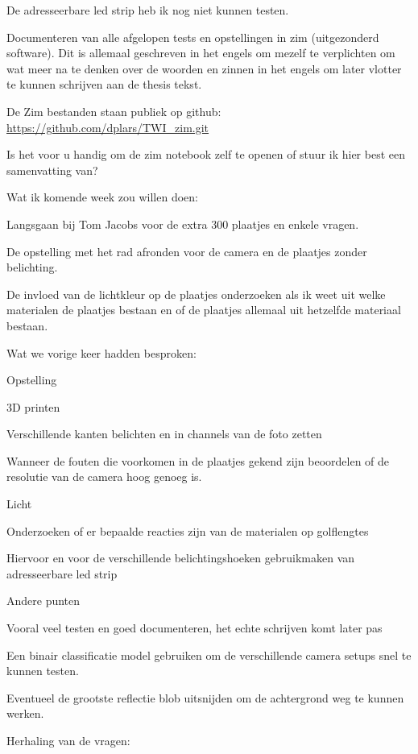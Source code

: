 \documentclass{scrartcl}
\begin{document}
De adresseerbare led strip heb ik nog niet kunnen testen.

Documenteren van alle afgelopen tests en opstellingen in zim (uitgezonderd software). Dit is allemaal geschreven in het engels om mezelf te verplichten om wat meer na te denken over de woorden en zinnen in het engels om later vlotter te kunnen schrijven aan de thesis tekst.

De Zim bestanden staan publiek op github: \href{https://github.com/dplars/TWI_zim.git}{https://github.com/dplars/TWI\_zim.git}

Is het voor u handig om de zim notebook zelf te openen of stuur ik hier best een samenvatting van?

 

Wat ik komende week zou willen doen:

Langsgaan bij Tom Jacobs voor de extra 300 plaatjes en enkele vragen.

De opstelling met het rad afronden voor de camera en de plaatjes zonder belichting.

De invloed van de lichtkleur op de plaatjes onderzoeken als ik weet uit welke materialen de plaatjes bestaan en of de plaatjes allemaal uit hetzelfde materiaal bestaan.

 

Wat we vorige keer hadden besproken:

Opstelling

3D printen

Verschillende kanten belichten en in channels van de foto zetten

Wanneer de fouten die voorkomen in de plaatjes gekend zijn beoordelen of de resolutie van de camera hoog genoeg is.

Licht

Onderzoeken of er bepaalde reacties zijn van de materialen op golflengtes

Hiervoor en voor de verschillende belichtingshoeken gebruikmaken van adresseerbare led strip

Andere punten

Vooral veel testen en goed documenteren, het echte schrijven komt later pas

Een binair classificatie model gebruiken om de verschillende camera setups snel te kunnen testen.

Eventueel de grootste reflectie blob uitsnijden om de achtergrond weg te kunnen werken.

 

Herhaling van de vragen:
\end{document}
